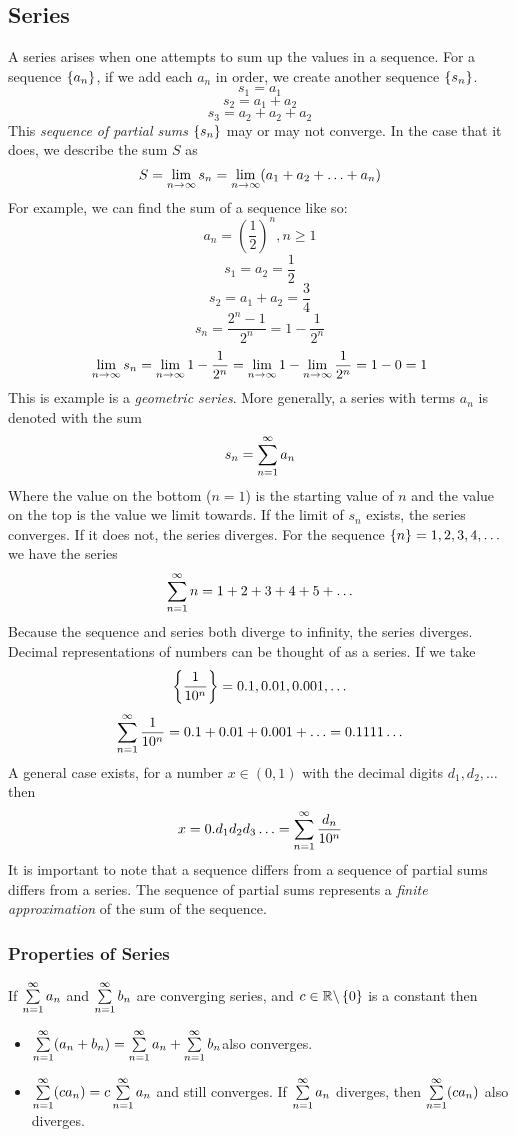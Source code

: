 \documentclass[12pt]{report}
\begin{document}
\begin{flushleft}
\subsection*{Series}
A series arises when one attempts to sum up the values in a sequence. For
a sequence \(\set{a_n}\), if we add each \(a_n\) in order, we create another
sequence \(\set{s_n}\).
\[s_1 = a_1\]
\[s_2 = a_1 + a_2\]
\[s_3 = a_2 + a_2 + a_2\]
This \textit{sequence of partial sums} \(\set{s_n}\) may or may not converge.
In the case that it does, we describe the sum \(S\) as
\[S = \lim\limits_{n\rightarrow\infty} s_n = \lim\limits_{n\rightarrow\infty} 
(a_1 + a_2 + \ldots + a_n)\]
For example, we can find the sum of a sequence like so:
\[a_n = \left(\frac{1}{2}\right)^n, n\geq 1\]
\[s_1 = a_2 = \frac{1}{2}\]
\[s_2 = a_1 + a_2 = \frac{3}{4}\]
\[s_n = \frac{2^n - 1}{2^n} = 1 - \frac{1}{2^n}\]
\[\lim\limits_{n\rightarrow\infty}s_n = \lim\limits_{n\rightarrow\infty} 1 - 
\frac{1}{2^n} = \lim\limits_{n\rightarrow\infty} 1 - \lim\limits_{n\rightarrow\infty} 
\frac{1}{2^n} = 1 - 0 = 1\]
This is example is a \textit{geometric series}. More generally, a series with
terms \(a_n\) is denoted with the sum
\[s_n = \sum\limits_{n = 1}^\infty a_n\]
Where the value on the bottom (\(n = 1\)) is the starting value of \(n\) and
the value on the top is the value we limit towards. If the limit of \(s_n\)
exists, the series converges. If it does not, the series diverges. For
the sequence \(\set{n} = 1, 2, 3, 4, \ldots\) we have the series
\[\sum\limits_{n = 1}^\infty n = 1 + 2 + 3 + 4 + 5 + \ldots\]
Because the sequence and series both diverge to infinity, the series diverges.
Decimal representations of numbers can be thought of as a series. If we take
\[\set{\frac{1}{10^n}} = 0.1, 0.01, 0.001, \ldots\]
\[\sum\limits_{n = 1}^\infty \frac{1}{10^n} = 0.1 + 0.01 + 0.001 + \ldots = 
0.1111\ldots\]
A general case exists, for a number \(x \in (0, 1)\) with the decimal digits
\(d_1, d_2, \ldots\) then
\[x = 0.d_1d_2d_3\ldots = \sum\limits_{n = 1}^\infty \frac{d_n}{10^n}\]
It is important to note that a sequence differs from a sequence of partial sums
differs from a series. The sequence of partial sums represents a \textit{finite
approximation} of the sum of the sequence.

\subsubsection*{Properties of Series}
If \(\sum\limits_{n = 1}^\infty a_n\) and \(\sum\limits_{n = 1}^\infty b_n\) are converging series, and 
\(c\in\mathbb{R}\backslash\set{0}\) is a constant then

\begin{itemize}
    \item \(\sum\limits_{n = 1}^\infty (a_n + b_n) = \sum\limits_{n = 1}^\infty a_n + \sum\limits_{n = 1}^\infty b_n\)also converges.
    \item \(\sum\limits_{n = 1}^\infty (ca_n) = c\sum\limits_{n = 1}^\infty a_n\) and still converges. If 
        \(\sum\limits_{n = 1}^\infty a_n\) diverges, then \(\sum\limits_{n = 1}^\infty (ca_n)\) also diverges.
\end{itemize}


\end{flushleft}
\end{document}
